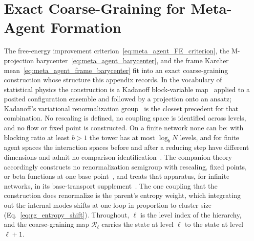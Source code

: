 \section{Exact Coarse-Graining for Meta-Agent Formation}
\label{sec:meta_agent_rg}

The free-energy improvement criterion~\eqref{eq:meta_agent_FE_criterion}, the M-projection barycenter~\eqref{eq:meta_agent_barycenter}, and the frame Karcher mean~\eqref{eq:meta_agent_frame_barycenter} fit into an exact coarse-graining construction whose structure this appendix records. In the vocabulary of statistical physics the construction is a Kadanoff block-variable map~\cite{kadanoff1966scaling} applied to a posited configuration ensemble and followed by a projection onto an ansatz; Kadanoff's variational renormalization group~\cite{Kadanoff1975, KadanoffHoughtonYalabik1976} is the closest precedent for that combination. No rescaling is defined, no coupling space is identified across levels, and no flow or fixed point is constructed. On a finite network none can be: with blocking ratio at least $b>1$ the tower has at most $\log_b N$ levels, and for finite agent spaces the interaction spaces before and after a reducing step have different dimensions and admit no comparison identification~\cite[Ch.~11]{DennisGaugeVFE2026}. The companion theory accordingly constructs no renormalization semigroup with rescaling, fixed points, or beta functions at one base point~\cite[Ch.~1]{DennisGaugeVFE2026}, and treats that apparatus, for infinite networks, in its base-transport supplement~\cite[Chs.~B5 and B6]{DennisGaugeVFESuppB2026}. The one coupling that the construction does renormalize is the parent's entropy weight, which integrating out the internal modes shifts at one loop in proportion to cluster size (Eq.~\eqref{eq:rg_entropy_shift}). Throughout, $\ell$ is the level index of the hierarchy, and the coarse-graining map $\mathcal{R}_\ell$ carries the state at level $\ell$ to the state at level $\ell+1$.

